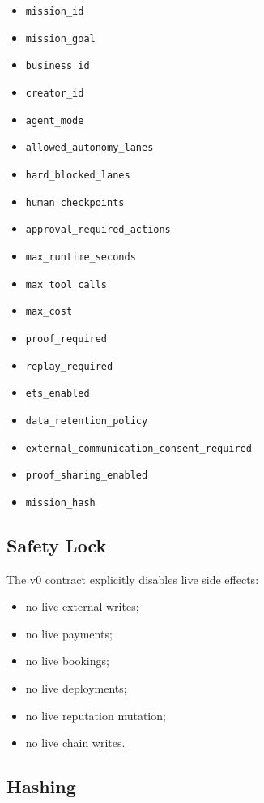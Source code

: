 \begin{itemize}
  \item \texttt{mission\_id}
  \item \texttt{mission\_goal}
  \item \texttt{business\_id}
  \item \texttt{creator\_id}
  \item \texttt{agent\_mode}
  \item \texttt{allowed\_autonomy\_lanes}
  \item \texttt{hard\_blocked\_lanes}
  \item \texttt{human\_checkpoints}
  \item \texttt{approval\_required\_actions}
  \item \texttt{max\_runtime\_seconds}
  \item \texttt{max\_tool\_calls}
  \item \texttt{max\_cost}
  \item \texttt{proof\_required}
  \item \texttt{replay\_required}
  \item \texttt{ets\_enabled}
  \item \texttt{data\_retention\_policy}
  \item \texttt{external\_communication\_consent\_required}
  \item \texttt{proof\_sharing\_enabled}
  \item \texttt{mission\_hash}
\end{itemize}

\subsection{Safety Lock}

The v0 contract explicitly disables live side effects:

\begin{itemize}
  \item no live external writes;
  \item no live payments;
  \item no live bookings;
  \item no live deployments;
  \item no live reputation mutation;
  \item no live chain writes.
\end{itemize}

\subsection{Hashing}

